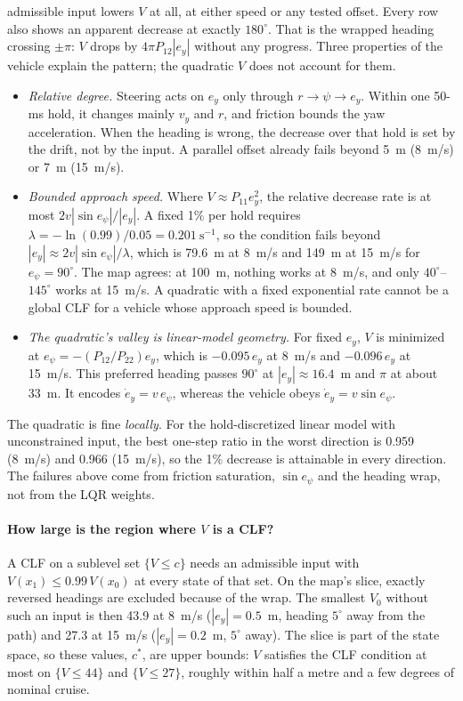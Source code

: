 \documentclass[11pt]{article}
\begin{document}
admissible input lowers $V$ at all, at either speed or any tested offset. Every
row also shows an apparent decrease at exactly $180^\circ$. That is the
wrapped heading crossing $\pm\pi$: $V$ drops by
$4\pi P_{12}|e_y|$ without any progress. Three properties of the vehicle
explain the pattern; the quadratic $V$ does not account for them.
\begin{itemize}
\item \emph{Relative degree.} Steering acts on $e_y$ only through
$r\rightarrow\psi\rightarrow e_y$. Within one 50-ms hold, it changes mainly
$v_y$ and $r$, and friction bounds the yaw acceleration. When the heading is
wrong, the decrease over that hold is set by the drift, not by the input. A
parallel offset already fails beyond 5~m (8~m/s) or 7~m (15~m/s).
\item \emph{Bounded approach speed.} Where $V\approx P_{11}e_y^2$, the relative
decrease rate is at most $2v|\sin e_\psi|/|e_y|$. A fixed 1\% per hold requires
$\lambda=-\ln(0.99)/0.05=0.201~\mathrm{s^{-1}}$, so the condition fails beyond
$|e_y|\approx2v|\sin e_\psi|/\lambda$, which is 79.6~m at 8~m/s and 149~m at
15~m/s for $e_\psi=90^\circ$. The map agrees: at 100~m, nothing works at 8~m/s,
and only $40^\circ$--$145^\circ$ works at 15~m/s. A quadratic with a fixed
exponential rate cannot be a global CLF for a vehicle whose approach speed is
bounded.
\item \emph{The quadratic's valley is linear-model geometry.} For fixed $e_y$,
$V$ is minimized at $e_\psi=-(P_{12}/P_{22})e_y$, which is $-0.095\,e_y$ at
8~m/s and $-0.096\,e_y$ at 15~m/s. This preferred heading passes $90^\circ$ at
$|e_y|\approx16.4$~m and $\pi$ at about 33~m. It encodes $\dot e_y=v\,e_\psi$, whereas the vehicle obeys
$\dot e_y=v\sin e_\psi$.
\end{itemize}
The quadratic is fine \emph{locally}. For the hold-discretized linear model with
unconstrained input, the best one-step ratio in the worst direction is 0.959
(8~m/s) and 0.966 (15~m/s), so the 1\% decrease is attainable in every
direction. The failures above come from friction saturation, $\sin e_\psi$ and
the heading wrap, not from the LQR weights.

\paragraph{How large is the region where $V$ is a CLF?} A CLF on a sublevel set
$\{V\le c\}$ needs an admissible input with $V(x_1)\le0.99\,V(x_0)$ at every
state of that set. On the map's slice, exactly reversed headings are excluded
because of the wrap. The smallest $V_0$ without such an input is then 43.9 at
8~m/s ($|e_y|=0.5$~m, heading $5^\circ$ away from the path) and 27.3 at 15~m/s
($|e_y|=0.2$~m, $5^\circ$ away). The slice is part of the state space, so these
values, $c^*$, are upper bounds: $V$ satisfies the CLF condition at most on
$\{V\le44\}$ and $\{V\le27\}$, roughly within half a metre and a few degrees
of nominal cruise.
\end{document}

